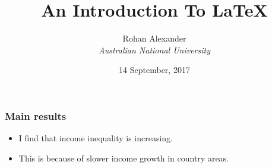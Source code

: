 \documentclass{beamer}
\begin{document}
\begin{frame}
\title{An Introduction To \LaTeX}
\author{Rohan Alexander\\
\textit{Australian National University}}
\date{14 September, 2017}
\maketitle
\end{frame}

\begin{frame}
\frametitle{Main results}
\begin{itemize}
\item I find that income inequality is increasing.
\item This is because of slower income growth in country areas.
\end{itemize}
\end{frame}
\end{document}
